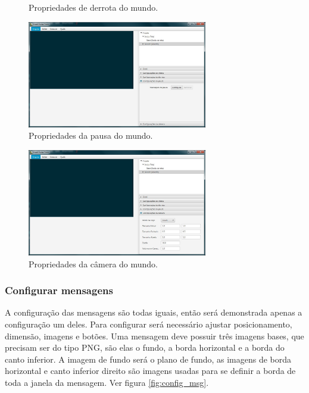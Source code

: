 \documentclass[12pt,twoside,openright,a4paper,english,brazil,sumario=tradicional]{abntex2}
\begin{document}
\begin{anexosenv}
\begin{figure}[htb]
   \caption{Propriedades de derrota do mundo.}
   \label{fig:add_mundo_4}
   \end{figure}
   \begin{figure}[htb]
   \centering
   \includegraphics[width=0.7\textwidth]{images/add_mundo_5.jpg}
   \caption{Propriedades da pausa do mundo.}
   \label{fig:add_mundo_5}
   \end{figure}
   \begin{figure}[htb]
   \centering
   \includegraphics[width=0.7\textwidth]{images/add_mundo_6.jpg}
   \caption{Propriedades da câmera do mundo.}
   \label{fig:add_mundo_6}
   \end{figure}

   \subsubsection{Configurar mensagens}
   A configuração das mensagens são todas iguais, então será demonstrada apenas a configuração um deles. Para configurar será necessário ajustar posicionamento, dimensão, imagens e botões. Uma mensagem deve possuir três imagens bases, que precisam ser do tipo PNG, são elas o fundo, a borda horizontal e a borda do canto inferior. A imagem de fundo será o plano de fundo, as imagens de borda horizontal e canto inferior direito são imagens usadas para se definir a borda de toda a janela da mensagem. Ver figura \ref{fig:config_msg}.


\end{anexosenv}
\end{document}
